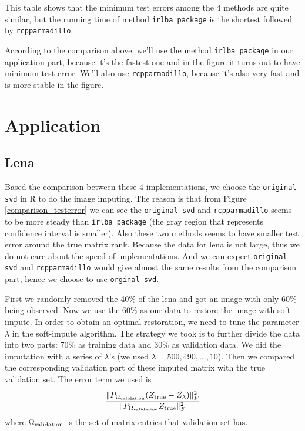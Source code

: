 \documentclass{article}
\begin{document}
This table shows that the minimum test errors among the 4 methods are quite similar, but the running time of method \verb|irlba package| is the shortest followed by \verb|rcpparmadillo|.

According to the comparison above, we'll use the method \verb|irlba package| in our application part, because it's the fastest one and in the figure it turns out to have minimum test error. We'll also use \verb|rcpparmadillo|, because it's also very fast and is more stable in the figure.

	\section{Application}
	\subsection{Lena}
	Based the comparison between these 4 implementations, we choose the \verb|original svd| in R to do the image imputing. The reason is that from {Figure} \ref{comparison_testerror} we can see the \verb|original svd| and \verb|rcpparmadillo| seems to be more steady than \verb|irlba package| (the gray region that represents confidence interval is smaller). Also these two methods seems to have smaller test error around the true matrix rank. Because the data for lena is not large, thus we do not care about the speed of implementations. And we can expect \verb|original svd| and \verb|rcpparmadillo| would give almost the same results from the comparison part, hence we choose to use \verb|orginal svd|. 

	First we randomly removed the 40\% of the lena and got an image with only 60\% being observed. Now we use the 60\% as our data to restore the image with soft-impute. In order to obtain an optimal restoration, we need to tune the parameter $\lambda$ in the soft-impute algorithm. The strategy we took is to further divide the data into two parts: 70\% as training data and 30\% as validation data. We did the imputation with a series of $\lambda$'s (we used $\lambda = 500, 490, \ldots, 10$). Then we compared the corresponding validation part of these imputed matrix with the true validation set. The error term we used is
	\begin{equation}\label{valid_error}
	\frac{\|P_{\Omega_{\rm validation}}(Z_{\rm true} - \hat{Z}_{\lambda})\|^2_{F}}{\|P_{\Omega_{\rm validation}} Z_{\rm true}\|_{F}^2}
	\end{equation}
	where $\Omega_{\rm validation}$ is the set of matrix entries that validation set has.
\end{document}
